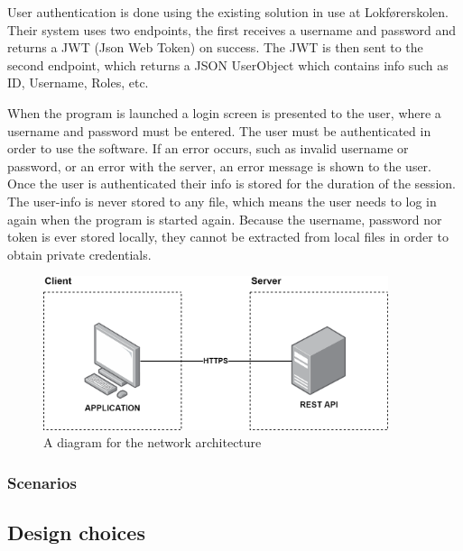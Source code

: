User authentication is done using the existing solution in use at Lokførerskolen. Their system uses two endpoints, the first receives a username and password and returns a JWT (Json Web Token) on success. The JWT is then sent to the second endpoint, which returns a JSON UserObject which contains info such as ID, Username, Roles, etc. 

When the program is launched a login screen is presented to the user, where a username and password must be entered. The user must be authenticated in order to use the software. If an error occurs, such as invalid username or password, or an error with the server, an error message is shown to the user. Once the user is authenticated their info is stored for the duration of the session. The user-info is never stored to any file, which means the user needs to log in again when the program is started again. Because the username, password nor token is ever stored locally, they cannot be extracted from local files in order to obtain private credentials.



\vspace*{1 cm} %
\begin{figure}[!htb]
    \centerline{\includegraphics[width=0.9\textwidth]{figures/NetworkArchitecture.png}}
    \caption[size=small]{A diagram for the network architecture}
\end{figure} 

\subsubsection{Scenarios}
\subsection{Design choices}
% 

